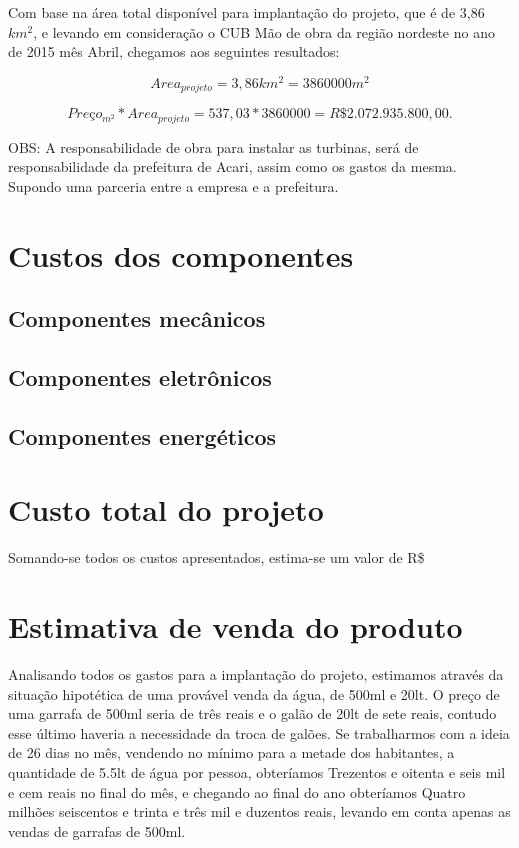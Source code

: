 	Com base na área total disponível para implantação do projeto, que é de 3,86 $km^2$, e levando em consideração o CUB Mão de obra da região nordeste no ano de 2015 mês Abril, chegamos aos seguintes resultados:
	
	$$ Area_{projeto} = 3,86 km^2 = 3860000 m^2$$
	
	$$ Preço_{m^2} * Area_{projeto} = 537,03 * 3860000 = R\$ 2.072.935.800,00.$$
	
	OBS: A responsabilidade de obra para instalar as turbinas, será de responsabilidade da prefeitura de Acari, assim como os gastos da mesma. Supondo uma parceria entre a empresa e a prefeitura.
	
    \section{Custos dos componentes}
      
      \subsection{Componentes mecânicos}
      
      \subsection{Componentes eletrônicos}
      
      \subsection{Componentes energéticos}
    
    \section{Custo total do projeto}
      
      Somando-se todos os custos apresentados, estima-se um valor de R\$
    
    \section{Estimativa de venda do produto}
    
      Analisando todos os gastos para a implantação do projeto, estimamos através da situação hipotética de uma provável venda da água,
      de 500ml e 20lt. O preço de uma garrafa de 500ml seria de três reais e o galão de 20lt de sete reais, contudo esse último haveria
      a necessidade da troca de galões. Se trabalharmos com a ideia de 26 dias no mês, vendendo no mínimo para a metade dos
      habitantes, a quantidade de 5.5lt de água por pessoa, obteríamos Trezentos e oitenta e seis mil e cem reais no final do
      mês, e chegando ao final do ano obteríamos Quatro milhões seiscentos e trinta e três mil e duzentos reais, levando em
      conta apenas as vendas de garrafas de 500ml.
      
